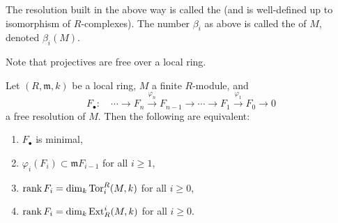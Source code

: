 \documentclass[12pt]{article}
\begin{document}
\begin{defn}
	The resolution built in the above way is called the  (and is well-defined up to isomorphism of $R$-complexes). The number $\beta_{i}$ as above is called the  of $M$, denoted $\beta_{i}(M)$.
\end{defn}
Note that projectives are free over a local ring.

\begin{prop} \label{prop:free-resolution-minimal-equivalence}
	Let $(R, \mathfrak{m}, k)$ be a local ring, $M$ a finite $R$-module, and
	\begin{equation*} 
		F_{\bullet} : \quad \cdots \to F_{n} \xrightarrow{\varphi_{n}} F_{n - 1} \to \cdots \to F_{1} \xrightarrow{\varphi_{1}} F_{0} \to 0
	\end{equation*}
	a free resolution of $M$. Then the following are equivalent:
	\begin{enumerate}[label=(\alph*)]
		\item $F_{\bullet}$ is minimal,
		\item $\varphi_{i}(F_{i}) \subset \mathfrak{m} F_{i - 1}$ for all $i \ge 1$,
		\item $\operatorname{rank} F_{i} = \dim_{k} \operatorname{Tor}^{R}_{i}(M, k)$ for all $i \ge 0$,
		\item $\operatorname{rank} F_{i} = \dim_{k} \operatorname{Ext}_{R}^{i}(M, k)$ for all $i \ge 0$.
	\end{enumerate}
\end{prop}
\end{document}
